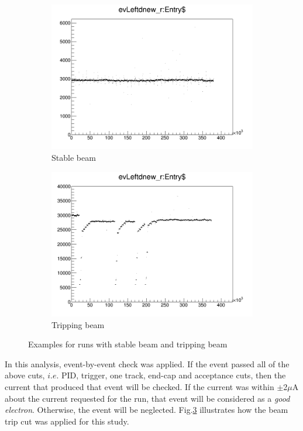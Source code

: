 \documentclass[11pt]{article}
\begin{document}
\begin{enumerate}
\begin{figure}[H]
\centering
\begin{subfigure}{.4\textwidth}
\centering
 \includegraphics[width=\linewidth]{stable.png}
  \caption{Stable beam}
  \label{fig:stable}
\end{subfigure}
\begin{subfigure}{.4\textwidth}
 \includegraphics[width=\linewidth]{909.png}
  \caption{Tripping beam}
  \label{fig:909}
\end{subfigure}
\caption{Examples for runs with stable beam and tripping beam}
\label{fig:beam}
\end{figure}
In this analysis, event-by-event check was applied. If the event passed all of the above cuts, $i.e.$ PID, trigger, one track, end-cap and acceptance cuts, then the current that produced that event will be checked. If the current was within $\pm$2$\mu$A  about the current requested for the run, that event will be considered as a \emph{good electron}. Otherwise, the event will be neglected. Fig.\ref{fig:beam} illustrates how the beam trip cut was applied for this study.


\end{enumerate}
\end{document}
